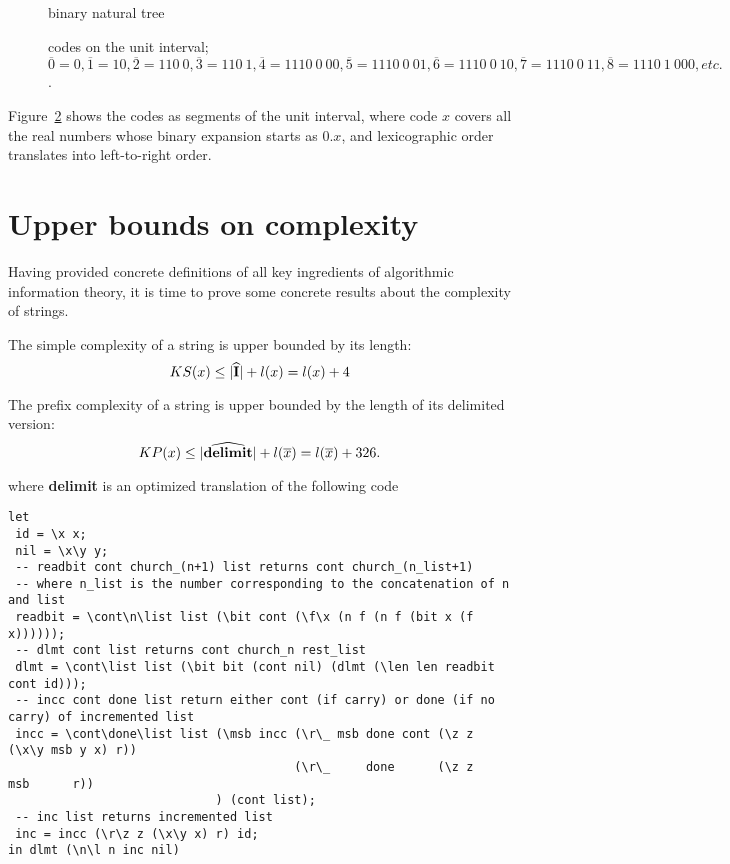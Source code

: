 \documentclass{article}
\newcommand{\brr}[1]{\overline{#1}}
\newcommand{\CI}{{\bf I}}
\begin{document}
\begin{figure}
\epsfxsize=8cm 
\caption{binary natural tree}
\label{natree}
\end{figure}

\begin{figure}
\epsfxsize=13cm 
\caption{codes on the unit interval;
$\brr{0} = 0, \brr{1} = 10, \brr{2} = 110\ 0, \brr{3} = 110\ 1, \brr{4} = 1110\ 0\ 00, \brr{5} = 1110\ 0\ 01, \brr{6} = 1110\ 0\ 10, \brr{7} = 1110\ 0\ 11, \brr{8} = 1110\ 1\ 000, etc.$.}
\label{kraft}
\end{figure}

Figure~\ref{kraft} shows the codes as segments of the unit interval,
where code $x$ covers all the real numbers whose binary expansion starts
as $0.x$, and lexicographic order translates into left-to-right order.


\section{Upper bounds on complexity}
Having provided concrete definitions of all key ingredients of algorithmic
information theory, it is time to prove some concrete results about
the complexity of strings.

The simple complexity of a string is upper bounded by its length:
\[ KS(x) \leq |\widehat{\CI}|+l(x) = l(x)+4 \]

The prefix complexity of a string is
upper bounded by the length of its delimited version:
\[ KP(x) \leq |\widehat{{\bf delimit}}|+l(\brr{x}) = l(\brr{x})+326. \]

where {\bf delimit} is an optimized translation
of the following code
{\small
\begin{verbatim}
let
 id = \x x;
 nil = \x\y y;
 -- readbit cont church_(n+1) list returns cont church_(n_list+1)
 -- where n_list is the number corresponding to the concatenation of n and list
 readbit = \cont\n\list list (\bit cont (\f\x (n f (n f (bit x (f x))))));
 -- dlmt cont list returns cont church_n rest_list
 dlmt = \cont\list list (\bit bit (cont nil) (dlmt (\len len readbit cont id)));
 -- incc cont done list return either cont (if carry) or done (if no carry) of incremented list
 incc = \cont\done\list list (\msb incc (\r\_ msb done cont (\z z (\x\y msb y x) r))
                                        (\r\_     done      (\z z       msb      r))
                             ) (cont list);
 -- inc list returns incremented list
 inc = incc (\r\z z (\x\y x) r) id;
in dlmt (\n\l n inc nil)
\end{verbatim}
}
\end{document}
